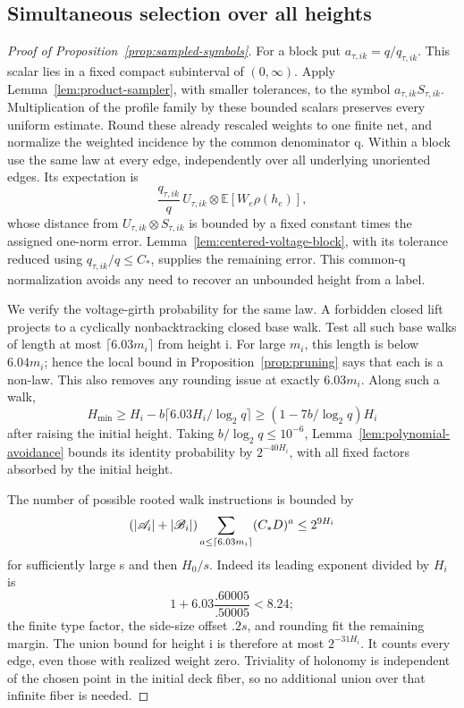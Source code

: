 \subsection{Simultaneous selection over all heights}
\label{subsec:analysis-simultaneous}

\begin{proof}[Proof of Proposition~\ref{prop:sampled-symbols}]
For a block put \(a_{\tau,ik}=q/q_{\tau,ik}\).  This scalar lies in a fixed
compact subinterval of \((0,\infty)\).  Apply
Lemma~\ref{lem:product-sampler}, with smaller tolerances, to the symbol
\(a_{\tau,ik}S_{\tau,ik}\).  Multiplication of the profile family by these
bounded scalars preserves every uniform estimate.  Round these already
rescaled weights to one finite net, and normalize the weighted incidence by
the common denominator q.  Within a block use the same law at every edge,
independently over all underlying unoriented edges.  Its expectation is
\[
 \frac{q_{\tau,ik}}q\,U_{\tau,ik}\otimes
       \mathbb E[W_e\rho(h_e)],
\]
whose distance from \(U_{\tau,ik}\otimes S_{\tau,ik}\) is bounded by a fixed
constant times the assigned one-norm error.
Lemma~\ref{lem:centered-voltage-block}, with its tolerance reduced using
\(q_{\tau,ik}/q\leq C_*\), supplies the remaining error.  This common-q
normalization avoids any need to recover an unbounded height from a label.

We verify the voltage-girth probability for the same law.  A forbidden closed
lift projects to a cyclically nonbacktracking closed base walk.  Test all such
base walks of length at most \(\lceil6.03m_i\rceil\) from height i.  For large
\(m_i\), this length is below \(6.04m_i\); hence the local bound in
Proposition~\ref{prop:pruning} says that each is a non-law.  This also removes
any rounding issue at exactly
\(6.03m_i\).  Along such a walk,
\[
 H_{\min}\geq H_i-b\lceil6.03H_i/\log_2q\rceil
 \geq(1-7b/\log_2q)H_i
\]
after raising the initial height.  Taking \(b/\log_2q\leq10^{-6}\),
Lemma~\ref{lem:polynomial-avoidance} bounds its identity probability by
\(2^{-40H_i}\), with all fixed factors absorbed by the initial height.

The number of possible rooted walk instructions is bounded by
\[
 (\left\lvert\mathscr A_i\right\rvert+\left\lvert\mathscr B_i\right\rvert)
   \sum_{a\leq\lceil6.03m_i\rceil}(C_*D)^a
 \leq2^{9H_i}
\]
for sufficiently large s and then \(H_0/s\).  Indeed its leading exponent
divided by \(H_i\) is
\[
 1+6.03\frac{.60005}{.50005}<8.24;
\]
the finite type factor, the side-size offset \(.2s\), and rounding fit the
remaining margin.  The union bound for height i is therefore at most
\(2^{-31H_i}\).  It counts every edge, even those with realized weight zero.
Triviality of holonomy is independent of the chosen point in the initial
deck fiber, so no additional union over that infinite fiber is needed.


\end{proof}
